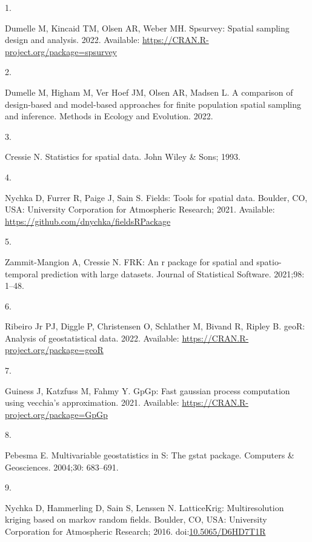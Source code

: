 \documentclass[10pt,letterpaper]{article}
\newlength{\cslhangindent}
\newlength{\csllabelwidth}
\newlength{\cslentryspacingunit} %
\newenvironment{CSLReferences}[2] %
 {%
  \setlength{\parindent}{0pt}
  \ifodd #1
  \let\oldpar\par
  \def\par{\hangindent=\cslhangindent\oldpar}
  \fi
  \setlength{\parskip}{#2\cslentryspacingunit}
 }%
 {}
\newcommand{\CSLLeftMargin}[1]{\parbox[t]{\csllabelwidth}{#1}}
\newcommand{\CSLRightInline}[1]{\parbox[t]{\linewidth - \csllabelwidth}{#1}\break}
\begin{document}
\hypertarget{refs}{}
\begin{CSLReferences}{0}{0}
\leavevmode\hypertarget{ref-dumelle2022spsurvey}{}%
\CSLLeftMargin{1. }
\CSLRightInline{Dumelle M, Kincaid TM, Olsen AR, Weber MH. Spsurvey:
Spatial sampling design and analysis. 2022. Available:
\url{https://CRAN.R-project.org/package=spsurvey}}

\leavevmode\hypertarget{ref-dumelle2022comparison}{}%
\CSLLeftMargin{2. }
\CSLRightInline{Dumelle M, Higham M, Ver Hoef JM, Olsen AR, Madsen L. A
comparison of design-based and model-based approaches for finite
population spatial sampling and inference. Methods in Ecology and
Evolution. 2022. }

\leavevmode\hypertarget{ref-cressie1993statistics}{}%
\CSLLeftMargin{3. }
\CSLRightInline{Cressie N. Statistics for spatial data. John Wiley \&
Sons; 1993. }

\leavevmode\hypertarget{ref-nychka2021fields}{}%
\CSLLeftMargin{4. }
\CSLRightInline{Nychka D, Furrer R, Paige J, Sain S. Fields: Tools for
spatial data. Boulder, CO, USA: University Corporation for Atmospheric
Research; 2021. Available:
\url{https://github.com/dnychka/fieldsRPackage}}

\leavevmode\hypertarget{ref-zammitmangion2021FRK}{}%
\CSLLeftMargin{5. }
\CSLRightInline{Zammit-Mangion A, Cressie N. FRK: An r package for
spatial and spatio-temporal prediction with large datasets. Journal of
Statistical Software. 2021;98: 1--48. }

\leavevmode\hypertarget{ref-ribiero2022geoR}{}%
\CSLLeftMargin{6. }
\CSLRightInline{Ribeiro Jr PJ, Diggle P, Christensen O, Schlather M,
Bivand R, Ripley B. geoR: Analysis of geostatistical data. 2022.
Available: \url{https://CRAN.R-project.org/package=geoR}}

\leavevmode\hypertarget{ref-guiness2021gpgp}{}%
\CSLLeftMargin{7. }
\CSLRightInline{Guiness J, Katzfuss M, Fahmy Y. GpGp: Fast gaussian
process computation using vecchia's approximation. 2021. Available:
\url{https://CRAN.R-project.org/package=GpGp}}

\leavevmode\hypertarget{ref-pebesma2004gstat}{}%
\CSLLeftMargin{8. }
\CSLRightInline{Pebesma E. Multivariable geostatistics in {S}: The gstat
package. Computers \& Geosciences. 2004;30: 683--691. }

\leavevmode\hypertarget{ref-nychka2016latticekrig}{}%
\CSLLeftMargin{9. }
\CSLRightInline{Nychka D, Hammerling D, Sain S, Lenssen N. LatticeKrig:
Multiresolution kriging based on markov random fields. Boulder, CO, USA:
University Corporation for Atmospheric Research; 2016.
doi:\href{https://doi.org/10.5065/D6HD7T1R}{10.5065/D6HD7T1R}}


\end{CSLReferences}
\end{document}
